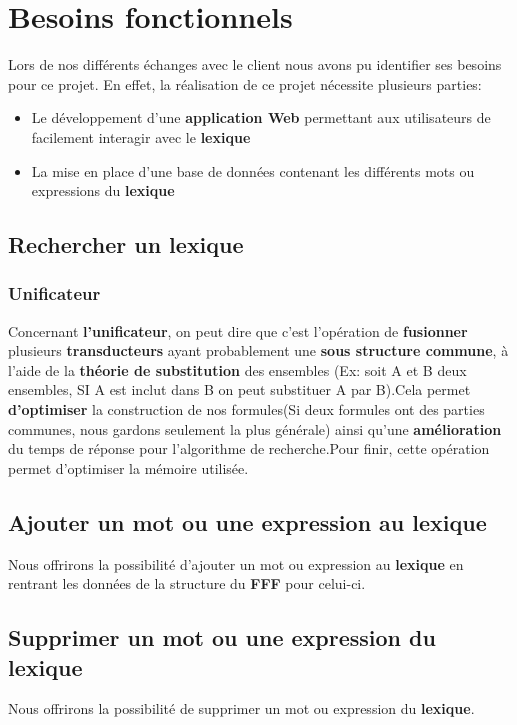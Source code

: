 \section{Besoins fonctionnels}
Lors de nos différents échanges avec le client nous avons pu identifier ses besoins pour ce projet. En effet, la réalisation de ce projet nécessite plusieurs parties:
\begin{itemize}
\item Le développement d'une \textbf{application Web} permettant aux utilisateurs de facilement interagir avec le \textbf{lexique}
\item La mise en place d'une base de données contenant les différents mots ou expressions du \textbf{lexique}
\end{itemize}


\subsection{Rechercher un lexique}

\subsubsection{Unificateur}{
Concernant \textbf{l'unificateur}, on peut dire que c'est l'opération de \textbf{fusionner} plusieurs \textbf{transducteurs} ayant probablement une \textbf{sous structure commune}, à l'aide de la \textbf{théorie de substitution} des ensembles (Ex: soit A et B deux ensembles, SI A est inclut dans B on peut substituer A par B).Cela permet \textbf{d'optimiser} la construction de nos formules(Si deux formules ont des parties communes, nous gardons seulement la plus générale) ainsi qu'une \textbf{amélioration} du temps de réponse pour l'algorithme de recherche.Pour finir, cette opération permet d'optimiser la mémoire utilisée.}
\subsection{Ajouter un mot ou une expression au lexique}

{Nous offrirons la possibilité d'ajouter un mot ou expression au \textbf{lexique} en rentrant les données de la structure du \textbf{FFF} pour celui-ci.\par}

\subsection{Supprimer un mot ou une expression du lexique}
{Nous offrirons la possibilité de supprimer un mot ou expression du \textbf{lexique}.\par}

